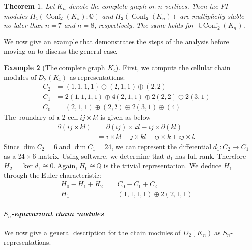 \documentclass[12pt]{amsart}
\newtheorem{thm}{Theorem}[section]
\theoremstyle{definition}
\newtheorem{example}[thm]{Example}
\newcommand{\Q}{\mathbb{Q}}
\newcommand{\conf}{\operatorname{Conf}}
\newcommand{\uconf}{\operatorname{UConf}}
\begin{document}
\begin{thm} \label{completeBound_2pts}
Let $K_n$ denote the complete graph on $n$ vertices. Then the FI-modules $H_1(\conf_2(K_n);\Q)$ and $H_2(\conf_2(K_n))$ are multiplicity stable no later than $n = 7$ and $n = 8$, respectively. The same holds for $\uconf_2(K_n)$.
\end{thm}

We now give an example that demonstrates the steps of the analysis before moving on to discuss the general case.

\begin{example}[The complete graph $K_4$]
    First, we compute the cellular chain modules of $D_2(K_4)$ as representations:
    \begin{align*}
        C_2 &= (1, 1, 1, 1) \oplus (2, 1, 1) \oplus (2, 2)\\
        C_1 &= 2(1, 1, 1, 1) \oplus 4(2, 1, 1) \oplus 2(2, 2) \oplus 2(3, 1)\\
        C_0 &= (2, 1, 1) \oplus (2, 2) \oplus 2(3, 1) \oplus (4)
    \end{align*}
    The boundary of a 2-cell ${ij}\times {kl}$ is given as below
    \begin{align*}
        \partial({ij}\times {kl}) &= \partial({ij})\times {kl}-{ij}\times \partial({kl})\\
        &= i\times {kl}-j\times {kl}-{ij}\times k+{ij}\times l.
    \end{align*}
    Since $\dim C_2 = 6$ and $\dim C_1 = 24$, we can represent the differential $d_1: C_2 \to C_1$ as a $24 \times 6$ matrix. Using software, we determine that $d_1$ has full rank. Therefore $H_2 = \ker d_1 \cong 0$. Again, $H_0 \cong \Q$ is the trivial representation. %
    We deduce $H_1$ through the Euler characteristic:
    \begin{align*}
        H_0-H_1+H_2 &= C_0-C_1+C_2\\
        H_1 &= (1,1,1,1) \oplus 2(2,1,1)
    \end{align*}
\end{example}

\paragraph{\textit{$S_n$-equivariant chain modules}} We now give a general description for the chain modules of $D_2(K_n)$ as $S_n$-representations.
\end{document}
